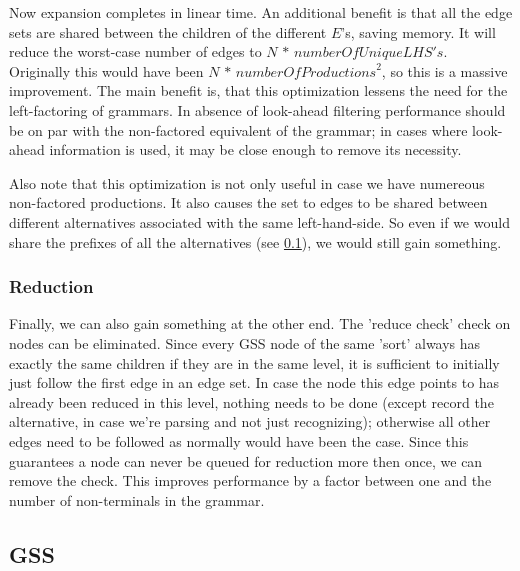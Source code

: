 \documentclass[a4paper,10pt]{article}
\begin{document}
Now expansion completes in linear time. An additional benefit is that all the edge sets are shared between the children of the different $E$'s, saving memory. It will reduce the worst-case number of edges to $N\,*\,\mathit{numberOfUniqueLHS's}$. Originally this would have been $N\,*\,\mathit{numberOfProductions}^2$, so this is a massive improvement. The main benefit is, that this optimization lessens the need for the left-factoring of grammars. In absence of look-ahead filtering performance should be on par with the non-factored equivalent of the grammar; in cases where look-ahead information is used, it may be close enough to remove its necessity.

Also note that this optimization is not only useful in case we have numereous non-factored productions. It also causes the set to edges to be shared between different alternatives associated with the same left-hand-side. So even if we would share the prefixes of all the alternatives (see \ref{sec:prefixSharing}), we would still gain something.

\subsubsection{Reduction}
Finally, we can also gain something at the other end. The 'reduce check' check on nodes can be eliminated. Since every GSS node of the same 'sort' always has exactly the same children if they are in the same level, it is sufficient to initially just follow the first edge in an edge set. In case the node this edge points to has already been reduced in this level, nothing needs to be done (except record the alternative, in case we're parsing and not just recognizing); otherwise all other edges need to be followed as normally would have been the case. Since this guarantees a node can never be queued for reduction more then once, we can remove the check. This improves performance by a factor between one and the number of non-terminals in the grammar.

\subsection{GSS}
\label{sec:prefixSharing}
\end{document}
